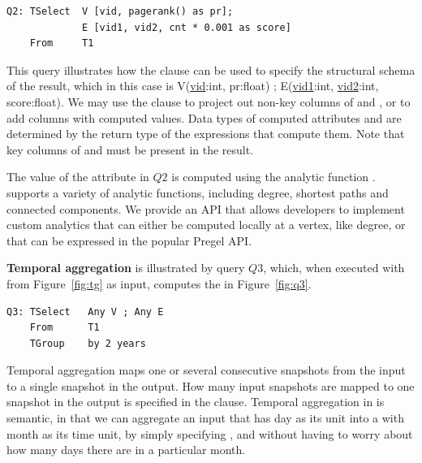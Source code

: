 \begin{verbatim}
Q2: TSelect  V [vid, pagerank() as pr]; 
             E [vid1, vid2, cnt * 0.001 as score]
    From     T1
\end{verbatim}

This query illustrates how the  clause can be used to
specify the structural schema of the result, which in this case is
V(\underline{vid}:int, pr:float) ; E(\underline{vid1}:int,
\underline{vid2}:int, score:float).  We may use the 
clause to project out non-key columns of  and , or
to add columns with computed values.  Data types of computed
attributes  and  are determined by the return
type of the expressions that compute them.  Note that key columns of
 and  must be present in the result.

The value of the attribute  in $Q2$ is computed using the
analytic function .  \ql supports a variety of
analytic functions, including degree, shortest paths and connected
components.  We provide an API that allows developers to implement
custom analytics that can either be computed locally at a vertex, like
degree, or that can be expressed in the popular Pregel API.

{\bf Temporal aggregation} is illustrated by query $Q3$, which, when
executed with  from Figure~\ref{fig:tg} as input, computes
the \tg in Figure~\ref{fig:q3}.

\begin{verbatim}
Q3: TSelect   Any V ; Any E 
    From      T1
    TGroup    by 2 years
\end{verbatim}

Temporal aggregation maps one or several consecutive snapshots from
the input to a single snapshot in the output.  How many input
snapshots are mapped to one snapshot in the output is specified in the
 clause.  Temporal aggregation in \ql is semantic, in
that we can aggregate an input \tg that has day as its unit into a \tg
with month as its time unit, by simply specifying , and without having to worry about how many days there are in
a particular month.

